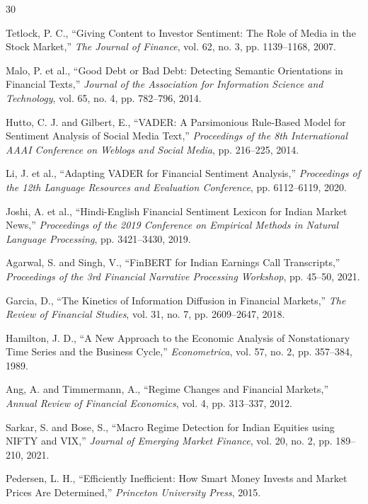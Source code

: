 \documentclass[12pt,a4paper]{report}
\begin{document}
\begin{thebibliography}{30}
{
Tetlock, P. C., ``Giving Content to Investor Sentiment: The Role of Media in the Stock Market,'' \textit{The Journal of Finance}, vol. 62, no. 3, pp. 1139--1168, 2007.

Malo, P. et al., ``Good Debt or Bad Debt: Detecting Semantic Orientations in Financial Texts,'' \textit{Journal of the Association for Information Science and Technology}, vol. 65, no. 4, pp. 782--796, 2014.

Hutto, C. J. and Gilbert, E., ``VADER: A Parsimonious Rule-Based Model for Sentiment Analysis of Social Media Text,'' \textit{Proceedings of the 8th International AAAI Conference on Weblogs and Social Media}, pp. 216--225, 2014.

Li, J. et al., ``Adapting VADER for Financial Sentiment Analysis,'' \textit{Proceedings of the 12th Language Resources and Evaluation Conference}, pp. 6112--6119, 2020.

Joshi, A. et al., ``Hindi-English Financial Sentiment Lexicon for Indian Market News,'' \textit{Proceedings of the 2019 Conference on Empirical Methods in Natural Language Processing}, pp. 3421--3430, 2019.

Agarwal, S. and Singh, V., ``FinBERT for Indian Earnings Call Transcripts,'' \textit{Proceedings of the 3rd Financial Narrative Processing Workshop}, pp. 45--50, 2021.

Garcia, D., ``The Kinetics of Information Diffusion in Financial Markets,'' \textit{The Review of Financial Studies}, vol. 31, no. 7, pp. 2609--2647, 2018.

Hamilton, J. D., ``A New Approach to the Economic Analysis of Nonstationary Time Series and the Business Cycle,'' \textit{Econometrica}, vol. 57, no. 2, pp. 357--384, 1989.

Ang, A. and Timmermann, A., ``Regime Changes and Financial Markets,'' \textit{Annual Review of Financial Economics}, vol. 4, pp. 313--337, 2012.

Sarkar, S. and Bose, S., ``Macro Regime Detection for Indian Equities using NIFTY and VIX,'' \textit{Journal of Emerging Market Finance}, vol. 20, no. 2, pp. 189--210, 2021.

Pedersen, L. H., ``Efficiently Inefficient: How Smart Money Invests and Market Prices Are Determined,'' \textit{Princeton University Press}, 2015.

}
\end{thebibliography}
\end{document}
